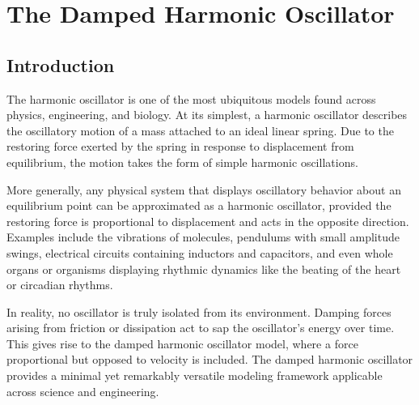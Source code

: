 \chapter{The Damped Harmonic Oscillator}
\label{ch18} 



\vspace{1cm}

\section{Introduction}

The harmonic oscillator is one of the most ubiquitous models found across physics, engineering, and biology. At its simplest, a harmonic oscillator describes the oscillatory motion of a mass attached to an ideal linear spring. Due to the restoring force exerted by the spring in response to displacement from equilibrium, the motion takes the form of simple harmonic oscillations.

More generally, any physical system that displays oscillatory behavior about an equilibrium point can be approximated as a harmonic oscillator, provided the restoring force is proportional to displacement and acts in the opposite direction. Examples include the vibrations of molecules, pendulums with small amplitude swings, electrical circuits containing inductors and capacitors, and even whole organs or organisms displaying rhythmic dynamics like the beating of the heart or circadian rhythms.

In reality, no oscillator is truly isolated from its environment. Damping forces arising from friction or dissipation act to sap the oscillator's energy over time. This gives rise to the damped harmonic oscillator model, where a force proportional but opposed to velocity is included. The damped harmonic oscillator provides a minimal yet remarkably versatile modeling framework applicable across science and engineering.

